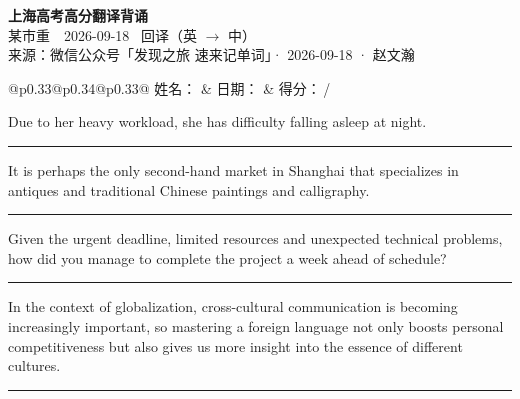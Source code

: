 \documentclass[11pt,a4paper]{article}
\newcommand{\num}[1]{\makebox[1.9em][r]{#1.}\hspace{0.3em}}
\newcommand{\wline}{\noindent\rule{\linewidth}{0.4pt}}
\begin{document}
\pagestyle{plain}
\begin{center}
{\LARGE\bfseries 上海高考高分翻译背诵 }\\[0.25em]
{\large 某市重　2026-09-18 \quad\ 回译（英 $\to$ 中）}\\[0.35em]
{\footnotesize 来源：微信公众号「发现之旅 速来记单词」· 2026-09-18 · 赵文瀚}
\end{center}

\vspace{0.4em}
\noindent\begin{tabular}{@{}p{0.33\textwidth}@{}p{0.34\textwidth}@{}p{0.33\textwidth}@{}}
姓名：\underline{\hspace{2.0cm}} & 日期：\underline{\hspace{2.0cm}} & 得分：\underline{\hspace{1.4cm}}\,/ \\
\end{tabular}

\vspace{0.5em}

\vspace{0.8em}
\num{1}Due to her heavy workload, she has difficulty falling asleep at night.

\vspace{0.25em}

\wline

\num{2}It is perhaps the only second-hand market in Shanghai that specializes in antiques and traditional Chinese paintings and calligraphy.

\vspace{0.25em}

\wline

\num{3}Given the urgent deadline, limited resources and unexpected technical problems, how did you manage to complete the project a week ahead of schedule?

\vspace{0.25em}

\wline

\num{4}In the context of globalization, cross-cultural communication is becoming increasingly important, so mastering a foreign language not only boosts personal competitiveness but also gives us more insight into the essence of different cultures.

\vspace{0.25em}

\wline
\end{document}
